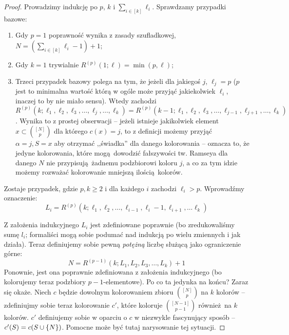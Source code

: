 \begin{proof}
	Prowadzimy indukcję po \(p\), \(k\) i \(\sum_{i \in [k]} \ell_i\). Sprawdzamy przypadki bazowe:
	\begin{enumerate}
		\item Gdy \(p = 1\) poprawność wynika z zasady szufladkowej, \(N = (\sum_{i \in [k]} \ell_i - 1) + 1\);
		\item Gdy \(k = 1\) trywialnie \(R^{(p)}(1; \ell) = \min(p, \ell)\);
		\item Trzeci przypadek bazowy polega na tym, że jeżeli dla jakiegoś \(j\), \(\ell_j = p\) (\(p\) jest to minimalna wartość którą w ogóle może przyjąć jakiekolwiek \(\ell_i\), inaczej to by nie miało sensu).
		      Wtedy zachodzi \(R^{(p)}(k; \ell_1,\ell_2,\ell_3,\ldots,\ell_j,\ldots,\ell_k) = R^{(p)}(k-1; \ell_1,\ell_2,\ell_3,\ldots,\ell_{j-1}, \ell_{j+1}, \ldots,\ell_k)\).
		      Wynika to z prostej obserwacji -- jeżeli istnieje jakikolwiek element \(x \subset \binom{[N]}{p}\) dla którego \(c(x) = j\), to
		      z definicji możemy przyjąć \(\alpha = j, S = x\) aby otrzymać ,,świadka'' dla danego kolorowania --
		      oznacza to, że jedyne kolorowania, które mogą dowodzić fałszywości tw. Ramseya dla danego \(N\) nie
		      przypisują żadnemu podzbiorowi koloru \(j\), a co za tym idzie możemy rozważać kolorowanie mniejszą ilością kolorów.
	\end{enumerate}

	Zostaje przypadek, gdzie \(p, k \geq 2\) i dla każdego \(i\) zachodzi \(\ell_i > p\). Wprowadźmy oznaczenie:
	\begin{equation*}
		L_i = R^{(p)}(k; \ell_1,\ell_2, \ldots, \ell_{i-1}, \ell_i - 1, \ell_{i+1}, \dots \ell_k)
	\end{equation*}

	Z założenia indukcyjnego \(L_i\) jest zdefiniowane poprawnie (bo zredukowaliśmy sumę \(l_i\); formaliści mogą sobie podumać nad indukcją po wielu zmiennych i jak działa).
	Teraz definiujemy sobie pewną \textit{potężną} liczbę służącą jako ograniczenie górne:
	\begin{equation*}
		N = R^{(p-1)}(k; L_1, L_2, L_3, \dots, L_k) + 1
	\end{equation*}
	Ponownie, jest ona poprawnie zdefiniowana z założenia indukcyjnego (bo kolorujemy teraz podzbiory \(p-1\)-elementowe). Po co ta jedynka na końcu? Zaraz się okaże.
	Niech \(c\) będzie dowolnym kolorowaniem zbioru \(\binom{[N]}{p}\) na \(k\) kolorów -- zdefiniujmy sobie teraz kolorowanie \(c'\), które koloruje \(\binom{[N-1]}{p-1}\) również na \(k\) kolorów.
	\(c'\) definiujemy sobie w oparciu o \(c\) w niezwykle fascynujący sposób -- \(c'(S) = c(S \cup \set{N})\). Pomocne może być tutaj narysowanie tej sytuacji.


\end{proof}
